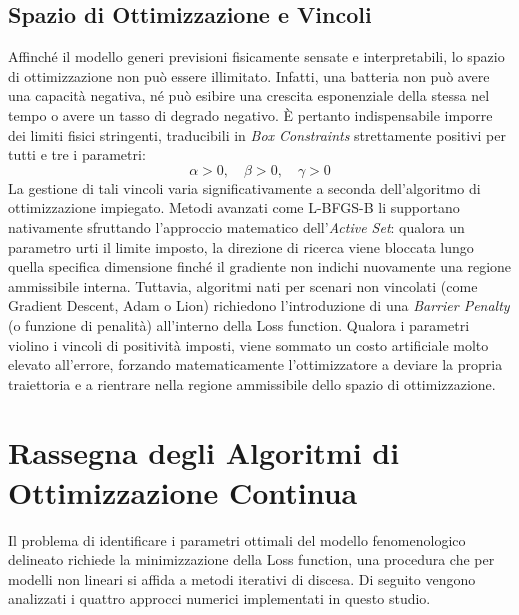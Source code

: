 \documentclass[11pt, a4paper]{article}
\begin{document}
\subsection{Spazio di Ottimizzazione e Vincoli}
Affinché il modello generi previsioni fisicamente sensate e interpretabili, lo spazio di ottimizzazione non può essere illimitato. Infatti, una batteria non può avere una capacità negativa, né può esibire una crescita esponenziale della stessa nel tempo o avere un tasso di degrado negativo. È pertanto indispensabile imporre dei limiti fisici stringenti, traducibili in \textit{Box Constraints} strettamente positivi per tutti e tre i parametri:
\begin{equation}
    \alpha > 0, \quad \beta > 0, \quad \gamma > 0
\end{equation}
La gestione di tali vincoli varia significativamente a seconda dell'algoritmo di ottimizzazione impiegato. Metodi avanzati come L-BFGS-B li supportano nativamente sfruttando l'approccio matematico dell'\textit{Active Set}: qualora un parametro urti il limite imposto, la direzione di ricerca viene bloccata lungo quella specifica dimensione finché il gradiente non indichi nuovamente una regione ammissibile interna. 
Tuttavia, algoritmi nati per scenari non vincolati (come Gradient Descent, Adam o Lion) richiedono l'introduzione di una \textit{Barrier Penalty} (o funzione di penalità) all'interno della Loss function. Qualora i parametri violino i vincoli di positività imposti, viene sommato un costo artificiale molto elevato all'errore, forzando matematicamente l'ottimizzatore a deviare la propria traiettoria e a rientrare nella regione ammissibile dello spazio di ottimizzazione.





\section{Rassegna degli Algoritmi di Ottimizzazione Continua}

Il problema di identificare i parametri ottimali del modello fenomenologico delineato richiede la minimizzazione della Loss function, una procedura che per modelli non lineari si affida a metodi iterativi di discesa. Di seguito vengono analizzati i quattro approcci numerici implementati in questo studio.
\end{document}
